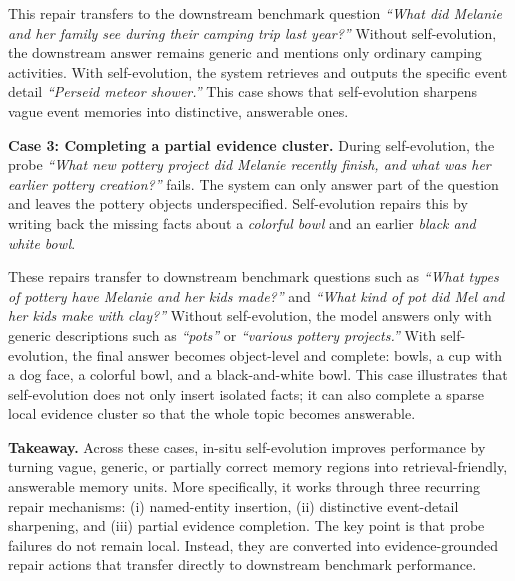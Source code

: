 This repair transfers to the downstream benchmark question \emph{``What did Melanie and her family see during their camping trip last year?''}
Without self-evolution, the downstream answer remains generic and mentions only ordinary camping activities.
With self-evolution, the system retrieves and outputs the specific event detail \emph{``Perseid meteor shower.''}
This case shows that self-evolution sharpens vague event memories into distinctive, answerable ones.

\noindent\textbf{Case 3: Completing a partial evidence cluster.}
During self-evolution, the probe \emph{``What new pottery project did Melanie recently finish, and what was her earlier pottery creation?''} fails.
The system can only answer part of the question and leaves the pottery objects underspecified.
Self-evolution repairs this by writing back the missing facts about a \emph{colorful bowl} and an earlier \emph{black and white bowl}.

These repairs transfer to downstream benchmark questions such as \emph{``What types of pottery have Melanie and her kids made?''} and \emph{``What kind of pot did Mel and her kids make with clay?''}
Without self-evolution, the model answers only with generic descriptions such as \emph{``pots''} or \emph{``various pottery projects.''}
With self-evolution, the final answer becomes object-level and complete: bowls, a cup with a dog face, a colorful bowl, and a black-and-white bowl.
This case illustrates that self-evolution does not only insert isolated facts; it can also complete a sparse local evidence cluster so that the whole topic becomes answerable.

\noindent\textbf{Takeaway.}
Across these cases, in-situ self-evolution improves performance by turning vague, generic, or partially correct memory regions into retrieval-friendly, answerable memory units.
More specifically, it works through three recurring repair mechanisms:
(i) named-entity insertion,
(ii) distinctive event-detail sharpening, and
(iii) partial evidence completion.
The key point is that probe failures do not remain local.
Instead, they are converted into evidence-grounded repair actions that transfer directly to downstream benchmark performance.




